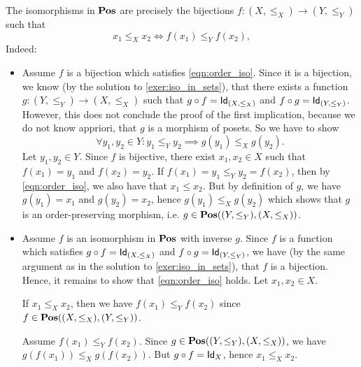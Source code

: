 \begin{solution}\label{sol:iso_in_pos}
The isomorphisms in $\POS$ are precisely the bijections $f:(X,\leq_X) \to (Y,\leq_Y)$ such that 
\begin{equation}\label{eqn:order_iso}
x_1 \leq_X x_2 \iff f(x_1) \leq_Y f(x_2),
\end{equation}
Indeed:
\begin{itemize}
\item Assume $f$ is a bijection which satisfies \cref{eqn:order_iso}. Since it is a bijection, we know (by the solution to \cref{exer:iso_in_sets}), that there exists a function $g:(Y,\leq_Y)\to (X,\leq_X)$ such that $\co{f}{g}=\Id[(X,\leq_X)]$ and $\co{g}{f}=\Id[(Y,\leq_Y)]$. However, this does not conclude the proof of the first implication, because we do not know appriori, that $g$ is a morphism of posets. So we have to show
\[
\forall y_1,y_2\in Y: y_1\leq_Y y_2 \implies g(y_1)\leq_X g(y_2).
\]
Let $y_1,y_2\in Y$. Since $f$ is bijective, there exist $x_1,x_2 \in X$ such that $f(x_1)=y_1$ and $f(x_2)=y_2$. If $f(x_1) = y_1\leq_Y y_2 = f(x_2)$, then by \cref{eqn:order_iso}, we also have that $x_1 \leq x_2$. But by definition of $g$, we have $g(y_1)=x_1$ and $g(y_2)=x_2$, hence $g(y_1)\leq_X g(y_2)$ which shows that $g$ is an order-preserving morphism, i.e. $g \in \CHom{\POS}{(Y,\leq_Y)}{(X,\leq_X)}$.
\item Assume $f$ is an isomorphism in $\POS$ with inverse $g$. Since $f$ is a function which satisfies $\co{f}{g}=\Id[(X,\leq_X)]$ and $\co{g}{f}=\Id[(Y,\leq_Y)]$, we have (by the same argument as in the solution to \cref{exer:iso_in_sets}), that $f$ is a bijection. Hence, it remains to show that \cref{eqn:order_iso} holds. Let $x_1,x_2\in X$.
  
  If $x_1\leq_X x_2$, then we have $f(x_1)\leq_Y f(x_2)$ since $f \in\CHom{\POS}{(X,\leq_X)}{(Y,\leq_Y)}$.
  
Assume $f(x_1)\leq_Y f(x_2)$. Since $g \in\CHom{\POS}{(Y,\leq_Y)}{(X,\leq_X)}$, we have $g(f(x_1)) \leq_X g(f(x_2))$. But $\co{f}{g} = \Id[X]$, hence $x_1 \leq_X x_2$.
\end{itemize}
\end{solution}

